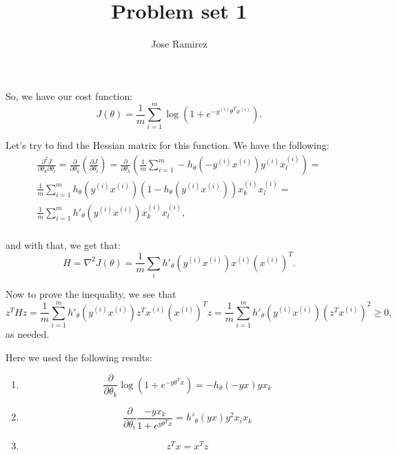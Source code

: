 \documentclass{article}
\title{Problem set 1}
\author{Jose Ramirez}
\begin{document}
\maketitle

So, we have our cost function:
$$
	J(\theta) = \frac{1}{m}\sum_{i = 1}^m \log(1 + e^{-y^{(i)}\theta^{T}x^{(i)}}).
$$

Let's try to find the Hessian matrix for this function. We have the following:
\begin{eqnarray*}
	\frac{\partial^2 J}{\partial{\theta_k} \partial{\theta_l}} =
	\frac{\partial}{\partial{\theta_k}}\left(\frac{\partial J}{\partial{\theta_l}}\right) =
	\frac{\partial}{\partial{\theta_k}}\left(\frac{1}{m}\sum_{i = 1}^m -h_{\theta}(-y^{(i)}x^{(i)})y^{(i)}x^{(i)}_l \right) = \\
	\frac{1}{m}\sum_{i = 1}^m h_{\theta}(y^{(i)}x^{(i)})(1 - h_{\theta}(y^{(i)}x^{(i)}))x^{(i)}_{k}x^{(i)}_{l} = \\
	\frac{1}{m}\sum_{i = 1}^m h'_{\theta}(y^{(i)}x^{(i)})x^{(i)}_{k}x^{(i)}_{l}, \\
\end{eqnarray*}

and with that, we get that:
$$
	H = \nabla^{2} J(\theta) = \frac{1}{m}\sum_{i} h'_{\theta}(y^{(i)}x^{(i)})x^{(i)}(x^{(i)})^{T}.
$$

Now to prove the inequality, we see that
$$
	z^THz = \frac{1}{m}\sum_{i = 1}^m h'_{\theta}(y^{(i)}x^{(i)})z^Tx^{(i)}(x^{(i)})^{T}z =
	\frac{1}{m}\sum_{i = 1}^m h'_{\theta}(y^{(i)}x^{(i)})(z^Tx^{(i)})^2 \geq 0,
$$
as needed.

Here we used the following results:
\begin{enumerate}
\item $$\frac{\partial}{\partial \theta_k}\log(1 + e^{-y\theta^Tx}) = -h_{\theta}(-yx)yx_k$$
\item $$\frac{\partial}{\partial \theta_i}\frac{-yx_k}{1 + e^{y\theta^Tx}} = h'_{\theta}(yx)y^2x_ix_k$$
\item $$z^Tx = x^Tz$$
\end{enumerate}
\end{document}
